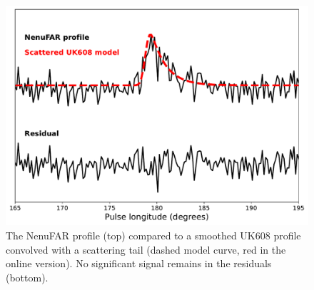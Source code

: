 \begin{figure}
    \includegraphics[width=\columnwidth]{Figures/J0250/nenufar_scattering}
    \caption[The scattered NenuFAR profile of PSR~J0250+5854]{The NenuFAR profile (top) compared to a smoothed UK608 profile convolved with a scattering tail (dashed model curve, red in the online version). No significant signal remains in the residuals (bottom).}
    \label{fig: nenufar scattering}
\end{figure}

